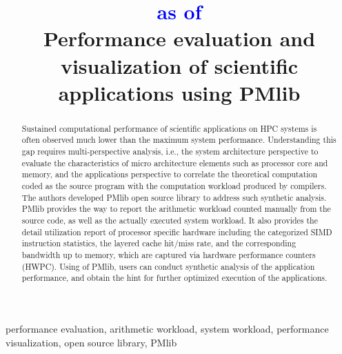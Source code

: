 \documentclass[conference]{IEEEtran}
\begin{document}
\title{
\textcolor{blue}{as of \DTMnow} \\
Performance evaluation and visualization of scientific applications using PMlib
}

\author{
\and
{}
}

\maketitle

\begin{abstract}
Sustained computational performance of scientific applications on HPC systems
is often observed much lower than the maximum system performance.
Understanding this gap requires multi-perspective analysis, i.e., the system
architecture perspective to evaluate the characteristics of micro architecture
elements such as processor core and memory, and the applications perspective
to correlate the theoretical computation coded as the source program with the
computation workload produced by compilers.
The authors developed PMlib open source library to address such synthetic analysis.
PMlib provides the way to report the arithmetic workload counted manually from
the source code, as well as the actually executed system workload.
It also provides the detail utilization report of processor specific hardware
including the categorized SIMD instruction statistics, the layered cache
hit/miss rate, and the corresponding bandwidth up to memory,
which are captured via hardware performance counters (HWPC).
Using of PMlib, users can conduct synthetic analysis of the application
performance, and obtain the hint for further optimized execution of
the applications.
\end{abstract}

\begin{IEEEkeywords}
performance evaluation,
arithmetic workload,
system workload,
performance visualization,
open source library,
PMlib
\end{IEEEkeywords}
\end{document}

